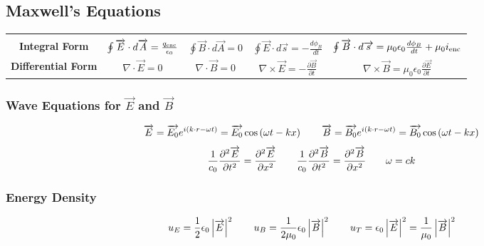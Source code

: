 \documentclass{article}
\begin{document}
\subsection*{Maxwell's Equations}
\begin{center}
\begin{tabular}{|| c c c c c ||}
\hline
&&&&\\
\textbf{Integral Form} & \(\oint\overrightarrow{E}\cdot d\overrightarrow{A}=\frac{q_{\textnormal{enc}}}{\epsilon_0}\) & \(\oint\overrightarrow{B}\cdot d\overrightarrow{A}=0\) & \(\oint\overrightarrow{E}\cdot d\overrightarrow{s}=-\frac{d\phi_B}{dt}\) & \(\oint\overrightarrow{B}\cdot d\overrightarrow{s}=\mu_0\epsilon_0\frac{d\phi_B}{dt}+\mu_0i_{\textnormal{enc}}\) \\[10pt]
\textbf{Differential Form} & \(\nabla\cdot\overrightarrow{E}=0\) & \(\nabla\cdot\overrightarrow{B}=0\) & \(\nabla\times\overrightarrow{E}=-\frac{\partial\overrightarrow{B}}{\partial t}\) & \(\nabla\times\overrightarrow{B}=\mu_0\epsilon_0\frac{\partial\overrightarrow{E}}{\partial t}\)\\[10pt]
\hline
\end{tabular}
\end{center}
\subsubsection*{Wave Equations for \(\overrightarrow{E}\) and \(\overrightarrow{B}\)}
\[\overrightarrow{E}=\overrightarrow{E_0}e^{i(k\cdot r-\omega t)}=\overrightarrow{E_0}\cos\left(\omega t -kx\right)\hspace{7 mm}\overrightarrow{B}=\overrightarrow{B_0}e^{i(k\cdot r-\omega t)}=\overrightarrow{B_0}\cos\left(\omega t -kx\right)\]
\[\frac{1}{c_0}\frac{\partial^2\overrightarrow{E}}{\partial t^2}=\frac{\partial^2\overrightarrow{E}}{\partial x^2}\hspace{7 mm}\frac{1}{c_0}\frac{\partial^2\overrightarrow{B}}{\partial t^2}=\frac{\partial^2\overrightarrow{B}}{\partial x^2}\hspace{7 mm}\omega=ck\]
\subsubsection*{Energy Density}
\[u_E=\frac{1}{2}\epsilon_0\left|\overrightarrow{E}\right|^2\hspace{7 mm}u_B=\frac{1}{2\mu_0}\epsilon_0\left|\overrightarrow{B}\right|^2\hspace{7 mm}u_T=\epsilon_0\left|\overrightarrow{E}\right|^2=\frac{1}{\mu_0}\left|\overrightarrow{B}\right|^2\]
\end{document}
